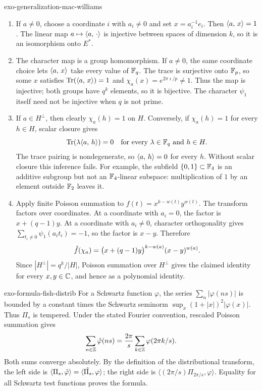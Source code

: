 \begin{correction}{exo-generalization-mac-williams}
\begin{enumerate}
\item If $a\neq0$, choose a coordinate $i$ with $a_i\neq0$ and set
$x=a_i^{-1}e_i$. Then $\langle a,\,x\rangle=1$. The linear map
$a\mapsto\langle a,\,\cdot\rangle$ is injective between spaces of dimension $k$,
so it is an isomorphism onto $E^*$.
\item The character map is a group homomorphism. If $a\neq0$, the same
coordinate choice lets $\langle a,\,x\rangle$ take every value of $\mathbb{F}_q$.
The trace is surjective onto $\mathbb{F}_p$, so some $x$ satisfies
$\operatorname{Tr}(\langle a,\,x\rangle)=1$ and $\chi_a(x)=e^{2\pi\imath/p}\neq1$.
Thus the map is injective; both groups have $q^k$ elements, so it is bijective.
The character $\psi_1$ itself need not be injective when $q$ is not prime.
\item If $a\in H^\perp$, then clearly $\chi_a(h)=1$ on $H$.
Conversely, if $\chi_a(h)=1$ for every $h\in H$, scalar closure gives
\[
 \operatorname{Tr}(\lambda\langle a,\,h\rangle)=0
 \quad\text{for every }\lambda\in\mathbb{F}_q\text{ and }h\in H.
\]
The trace pairing is nondegenerate, so $\langle a,\,h\rangle=0$ for every $h$.
Without scalar closure this inference fails. For example, the subfield
$\{0,1\}\subset\mathbb{F}_4$ is an additive subgroup but not an $\mathbb{F}_4$-linear
subspace: multiplication of $1$ by an element outside $\mathbb{F}_2$ leaves it.
\item Apply finite Poisson summation to
$f(t)=x^{k-w(t)}y^{w(t)}$. The transform factors over coordinates.
At a coordinate with $a_i=0$, the factor is $x+(q-1)y$.
At a coordinate with $a_i\neq0$, character orthogonality gives
$\sum_{t_i\neq0}\psi_1(a_it_i)=-1$, so the factor is $x-y$.
Therefore
\[
 \hat{f}(\chi_a)=\bigl(x+(q-1)y\bigr)^{k-w(a)}(x-y)^{w(a)}.
\]
Since $|H^\perp|=q^k/|H|$, Poisson summation over $H^\perp$ gives the
claimed identity for every $x,y\in\mathbb{C}$, and hence as a polynomial identity.
\end{enumerate}
\end{correction}

\begin{correction}{exo-formula-fish-distrib}
For a Schwartz function $\varphi$, the series
$\sum_n|\varphi(ns)|$ is bounded by a constant times the Schwartz seminorm
$\sup_x(1+|x|)^2|\varphi(x)|$. Thus $\Pi_s$ is tempered.
Under the stated Fourier convention, rescaled Poisson summation gives
\[
 \sum_{n\in\mathbb{Z}}\hat{\varphi}(ns)
       =\frac{2\pi}s\sum_{k\in\mathbb{Z}}\varphi(2\pi k/s).
\]
Both sums converge absolutely. By the definition of the distributional
transform, the left side is
$\langle\Pi_s,\hat{\varphi}\rangle=\langle\hat{\Pi_s},\varphi\rangle$;
the right side is $\langle(2\pi/s)\Pi_{2\pi/s},\varphi\rangle$.
Equality for all Schwartz test functions proves the formula.
\end{correction}

